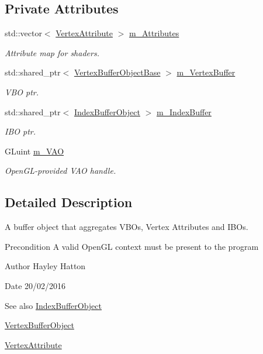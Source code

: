 \subsection*{Private Attributes}
\begin{DoxyCompactItemize}
\item 
std\+::vector$<$ \hyperlink{class_vertex_attribute}{Vertex\+Attribute} $>$ \hyperlink{class_vertex_array_object_aacb321d71b55ce0f75dfe5b28e8c748c}{m\+\_\+\+Attributes}
\begin{DoxyCompactList}\small\item\em Attribute map for shaders. \end{DoxyCompactList}\item 
std\+::shared\+\_\+ptr$<$ \hyperlink{class_vertex_buffer_object_base}{Vertex\+Buffer\+Object\+Base} $>$ \hyperlink{class_vertex_array_object_a2e6040e6adfc2bbcf29d48013c48af04}{m\+\_\+\+Vertex\+Buffer}
\begin{DoxyCompactList}\small\item\em V\+BO ptr. \end{DoxyCompactList}\item 
std\+::shared\+\_\+ptr$<$ \hyperlink{class_index_buffer_object}{Index\+Buffer\+Object} $>$ \hyperlink{class_vertex_array_object_acd24cb60a9b2efe8e81cf50f1a6ebe1a}{m\+\_\+\+Index\+Buffer}
\begin{DoxyCompactList}\small\item\em I\+BO ptr. \end{DoxyCompactList}\item 
G\+Luint \hyperlink{class_vertex_array_object_a9def0a990bac4db152e962d4d1a84f0f}{m\+\_\+\+V\+AO}
\begin{DoxyCompactList}\small\item\em Open\+G\+L-\/provided V\+AO handle. \end{DoxyCompactList}\end{DoxyCompactItemize}


\subsection{Detailed Description}
A buffer object that aggregates V\+B\+Os, Vertex Attributes and I\+B\+Os. 

\begin{DoxyPrecond}{Precondition}
A valid Open\+GL context must be present to the program 
\end{DoxyPrecond}
\begin{DoxyAuthor}{Author}
Hayley Hatton 
\end{DoxyAuthor}
\begin{DoxyDate}{Date}
20/02/2016 
\end{DoxyDate}
\begin{DoxySeeAlso}{See also}
\hyperlink{class_index_buffer_object}{Index\+Buffer\+Object} 

\hyperlink{class_vertex_buffer_object}{Vertex\+Buffer\+Object} 

\hyperlink{class_vertex_attribute}{Vertex\+Attribute} 
\end{DoxySeeAlso}



